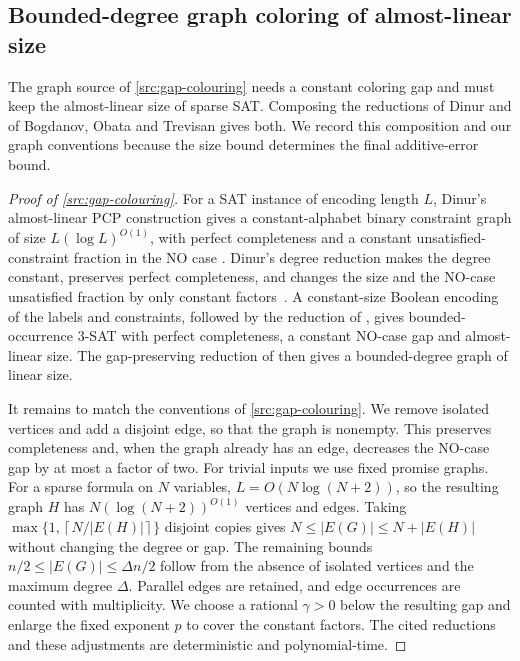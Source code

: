 \documentclass[11pt,letterpaper]{article} \usepackage[utf8]{inputenc}
\theoremstyle{plain} \newtheorem{theorem}{Theorem}[section]
\theoremstyle{definition} \newaliascnt{definition}{theorem}
\newcommand{\ceil}[1]{\left\lceil#1\right\rceil}
\begin{document}
\subsection{Bounded-degree graph coloring of almost-linear size}
\label{app:graph-source}

The graph source of \cref{src:gap-colouring} needs a constant coloring gap
and must keep the almost-linear size of sparse SAT. Composing the reductions of
Dinur and of Bogdanov, Obata and Trevisan gives both. We record this composition
and our graph conventions because the size bound determines the final additive-error bound.

\begin{proof}[Proof of \cref{src:gap-colouring}]
\label{proof:src:gap-colouring}
For a SAT instance of encoding length $L$, Dinur's almost-linear PCP
construction gives a constant-alphabet binary constraint graph of size
$L(\log L)^{O(1)}$, with perfect completeness and a constant
unsatisfied-constraint fraction in the NO case
\cite[Lemma~8.3 and proof of Theorem~8.1]{dinur2007pcp}.
Dinur's degree reduction makes the degree constant, preserves perfect
completeness, and changes the size and the NO-case unsatisfied fraction by
only constant factors~\cite[Lemma~1.7]{dinur2007pcp}.
A constant-size Boolean encoding of the labels and constraints, followed by
the reduction of \citet[Lemma~11]{bogdanov2002lower}, gives bounded-occurrence $3$-SAT
with perfect completeness, a constant NO-case gap and almost-linear size. The gap-preserving reduction of
\citet[Theorem~14 and its proof, pp.~98--99]{bogdanov2002lower}
then gives a bounded-degree graph of linear size.

It remains to match the conventions of \cref{src:gap-colouring}. We remove isolated vertices and add a
disjoint edge, so that the graph is nonempty. This preserves completeness and, when the graph already has
an edge, decreases the NO-case gap by at most a factor of two. For trivial inputs we use fixed promise graphs.
For a sparse formula on $N$ variables, $L=O(N\log(N+2))$, so the resulting
graph $H$ has $N(\log(N+2))^{O(1)}$ vertices and edges. Taking
$\max\{1,\ceil{N/|E(H)|}\}$ disjoint copies gives
$N\le |E(G)|\le N+|E(H)|$ without changing the degree or gap.
The remaining bounds $n/2\le|E(G)|\le\Delta n/2$ follow from the absence of
isolated vertices and the maximum degree $\Delta$. Parallel edges are retained, and edge
occurrences are counted with multiplicity. We choose a rational $\gamma>0$
below the resulting gap and enlarge the fixed exponent $p$ to cover the
constant factors. The cited reductions and these adjustments are
deterministic and polynomial-time.
\end{proof}
\end{document}
